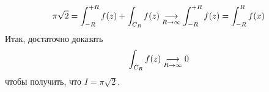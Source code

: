 \begin{align*}
  \pi \sqrt{2} = \int_{-R}^{+R}f(z) + \int_{C_R}f(z) \underset{R\to \infty}{\longrightarrow} \int_{-R}^{+R} f(z) = \int_{-R}^{R}f(x)
\end{align*}
Итак, достаточно доказать
\begin{align*}
  \int_{C_R}f(z)  \underset{R\to \infty}{\longrightarrow} 0
\end{align*}
чтобы получить, что $I = \pi \sqrt{2}$.

